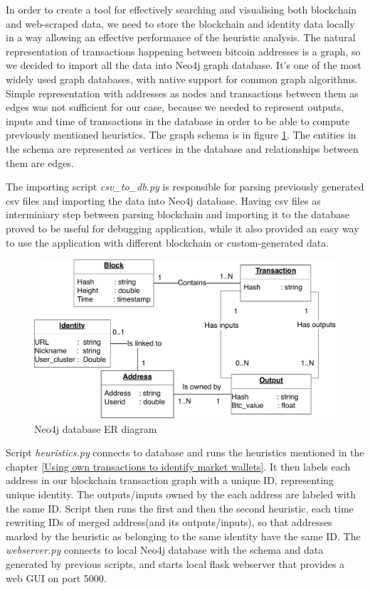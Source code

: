 \documentclass[
  digital, %
  table,   %
  lof,     %
  lot,     %
  oneside
]{fithesis3}
\begin{document}
In order to create a tool for effectively searching and visualising both blockchain and web-scraped
data, we need to store the blockchain and identity data locally in a way allowing an effective
performance of the heuristic analysis.
The natural representation of transactions happening between
bitcoin addresses is a graph, so we decided to import all the data into Neo4j graph database. It's one of the
most widely used graph databases, with native support for common graph algorithms.
Simple representation with addresses as nodes and transactions between them as edges was not
sufficient for our case, because we needed to represent
outputs, inputs and time of transactions in the database in order to be able to compute previously mentioned heuristics. 
The graph schema is in figure \ref{Neo4jschema}. The entities in the schema are represented as vertices
 in the database and relationships between them are edges.

The importing script \emph{csv\_to\_db.py} is responsible for parsing
previously generated csv files and importing the data into Neo4j database.
Having csv files as interminiary step between parsing blockchain and importing it to the database
proved to be useful for debugging application, while it also provided an easy way to
use the application with different blockchain or custom-generated data.

\begin{figure}[!htb]
    \centering
    \includegraphics[width=1\textwidth]{neo4j-schema}
    \caption{Neo4j database ER diagram}
    \label{Neo4jschema}
\end{figure}

Script \emph{heuristics.py} connects to database and runs the heuristics mentioned in the chapter
\ref{Using own transactions to identify market wallets}.
It then labels each address in our blockchain transaction graph
with a unique ID, representing unique identity. The outputs/inputs owned by the each address are labeled
with the same ID. Script then runs the first and then the second heuristic,
each time rewriting IDs of merged address(and its outputs/inputs), so that 
addresses marked by the heuristic as belonging to the same identity have the same ID.
The \emph{webserver.py} connects to local Neo4j database with the schema and data generated by previous
scripts, and starts local flask webserver that provides a web GUI on port 5000.
\end{document}
